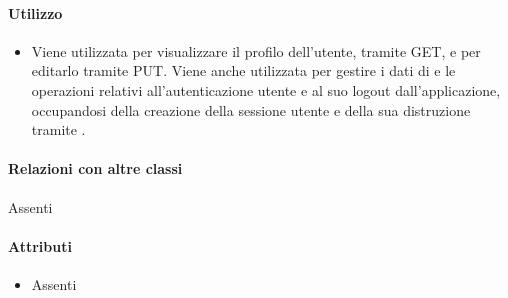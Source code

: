\paragraph*{Utilizzo}
\begin{itemize}
\item[] Viene utilizzata per visualizzare il profilo dell'utente, tramite GET, e per editarlo tramite PUT. Viene anche utilizzata per gestire i dati di e le operazioni relativi all'autenticazione utente e al suo logout dall'applicazione, occupandosi della creazione della sessione utente e della sua distruzione tramite .
\end{itemize}

\paragraph*{Relazioni con altre classi}
Assenti

\paragraph*{Attributi}
\begin{itemize}
\item[] Assenti
\end{itemize}

